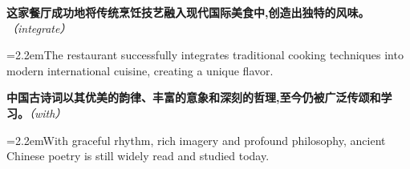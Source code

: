 \documentclass[11pt,a4paper]{article}
\newcommand{\num}[1]{\makebox[1.9em][r]{#1.}\hspace{0.3em}}
\newcommand{\prompt}[1]{\emph{\textcolor{tipblue}{\small（#1）}}}
\begin{document}
\begin{minipage}{\linewidth}

\num{27}\textbf{这家餐厅成功地将传统烹饪技艺融入现代国际美食中,创造出独特的风味。}\prompt{integrate}

\vspace{0.15em}

\noindent\hangindent=2.2em\hspace{2.2em}The restaurant successfully integrates traditional cooking techniques into modern international cuisine, creating a unique flavor.

\end{minipage}

\begin{minipage}{\linewidth}

\num{28}\textbf{中国古诗词以其优美的韵律、丰富的意象和深刻的哲理,至今仍被广泛传颂和学习。}\prompt{with}

\vspace{0.15em}

\noindent\hangindent=2.2em\hspace{2.2em}With graceful rhythm, rich imagery and profound philosophy, ancient Chinese poetry is still widely read and studied today.

\end{minipage}
\end{document}
